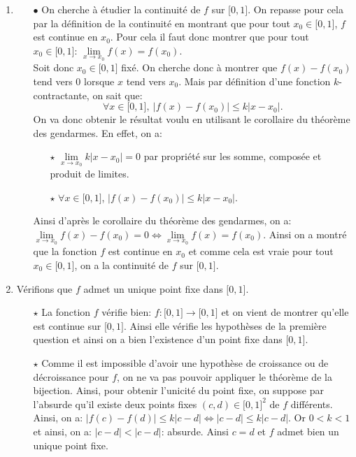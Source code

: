 \begin{correction}  \;
\begin{enumerate}
\item 
\begin{itemize}
\item[$\bullet$] On cherche \`{a} \'etudier la continuit\'e de $f$ sur $\lbrack 0,1\rbrack$. On repasse pour cela par la d\'efinition de la continuit\'e en montrant que pour tout $x_0\in\lbrack 0,1\rbrack$, $f$ est continue en $x_0$. Pour cela il faut donc montrer que pour tout $x_0\in\lbrack 0,1\rbrack$: $\lim\limits_{x\to x_0} f(x)=f(x_0)$.\\
\noindent Soit donc $x_0\in\lbrack 0,1\rbrack$ fix\'e. On cherche donc \`{a} montrer que $f(x)-f(x_0)$ tend vers 0 lorsque $x$ tend vers $x_0$. Mais par d\'efinition d'une fonction $k$-contractante, on sait que:
$$\forall x\in\lbrack 0,1\rbrack,\ |f(x)-f(x_0)|\leq k|x-x_0|.$$
On va donc obtenir le r\'esultat voulu en utilisant le corollaire du th\'eor\`{e}me des gendarmes. En effet, on a:
\begin{itemize}
\item[$\star$] $\lim\limits_{x\to x_0} k |x-x_0|=0$ par propri\'et\'e sur les somme, compos\'ee et produit de limites.
\item[$\star$] $\forall x\in\lbrack 0,1\rbrack$, $|f(x)-f(x_0)|\leq k |x-x_0|$.
\end{itemize}
Ainsi d'apr\`{e}s le corollaire du th\'eor\`{e}me des gendarmes, on a: $\lim\limits_{x\to x_0} f(x)-f(x_0)=0\Leftrightarrow \lim\limits_{x\to x_0} f(x)=f(x_0)$. Ainsi on a montr\'e que la fonction $f$ est continue en $x_0$ et comme cela est vraie pour tout $x_0\in\lbrack 0,1\rbrack$, on a la continuit\'e de $f$ sur $\lbrack 0,1\rbrack$. 

\end{itemize}
\item V\'erifions que $f$ admet un unique point fixe dans $\lbrack 0,1\rbrack$.
\begin{itemize}
\item[$\star$] La fonction $f$ v\'erifie bien: $f: \lbrack 0,1\rbrack\rightarrow \lbrack 0,1\rbrack$ et on vient de montrer qu'elle est continue sur $\lbrack 0,1\rbrack$. Ainsi elle v\'erifie les hypoth\`{e}ses de la premi\`{e}re question et ainsi on a bien l'existence d'un point fixe dans $\lbrack 0,1\rbrack$.
\item[$\star$] Comme il est impossible d'avoir une hypoth\`{e}se de croissance ou de d\'ecroissance pour $f$, on ne va pas pouvoir appliquer le th\'eor\`{e}me de la bijection. Ainsi, pour obtenir l'unicit\'e du point fixe, on suppose par l'absurde qu'il existe deux points fixes $(c,d)\in\lbrack 0,1\rbrack^2$ de $f$ diff\'erents. Ainsi, on a: 
$|f(c)-f(d)|\leq k|c-d|\Leftrightarrow |c-d|\leq k|c-d|$. Or $0<k<1$ et ainsi, on a: $|c-d|<|c-d|$: absurde. Ainsi $c=d$ et $f$ admet bien un unique point fixe.
\end{itemize}


\end{enumerate}
\end{correction}
